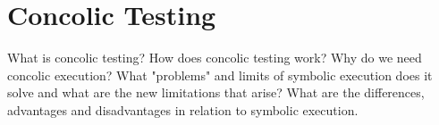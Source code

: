 \section{Concolic Testing}
What is concolic testing? How does concolic testing work? Why do we need concolic execution? What "problems" and limits of symbolic execution does it solve and what are the new limitations that arise?
What are the differences, advantages and disadvantages in relation to symbolic execution.
\cite{Cadar:2006:EAG:1180405.1180445}
\cite{Cadar:2008:KUA:1855741.1855756}
\cite{Cadar:2013:SES:2408776.2408795}
\cite{Godefroid:2005:DDA:1064978.1065036}
\cite{Godefroid:2012:SWF:2090147.2094081}